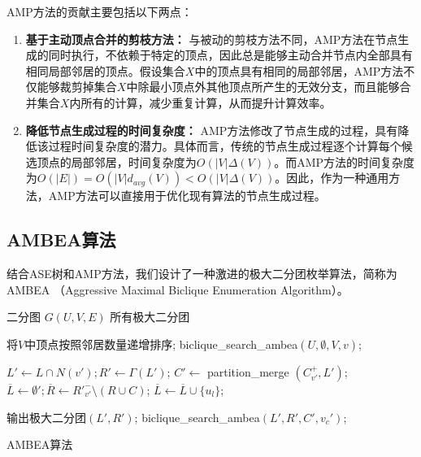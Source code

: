 AMP方法的贡献主要包括以下两点：

\begin{enumerate}
  \item \textbf{基于主动顶点合并的剪枝方法：} 与被动的剪枝方法不同，AMP方法在节点生成的同时执行，不依赖于特定的顶点，因此总是能够主动合并节点内全部具有相同局部邻居的顶点。假设集合$X$中的顶点具有相同的局部邻居，AMP方法不仅能够裁剪掉集合$X$中除最小顶点外其他顶点所产生的无效分支，而且能够合并集合$X$内所有的计算，减少重复计算，从而提升计算效率。
  
  \item \textbf{降低节点生成过程的时间复杂度：} AMP方法修改了节点生成的过程，具有降低该过程时间复杂度的潜力。具体而言，传统的节点生成过程逐个计算每个候选顶点的局部邻居，时间复杂度为$O(|V|\Delta(V))$。而AMP方法的时间复杂度为$O(|E|) =O(|V|d_{avg}(V)) < O(|V|\Delta(V))$。因此，作为一种通用方法，AMP方法可以直接用于优化现有算法的节点生成过程。

\end{enumerate}

\subsection{AMBEA算法}
\label{subsec:ambea}
  结合ASE树和AMP方法，我们设计了一种激进的极大二分团枚举算法，简称为AMBEA （Aggressive Maximal Biclique Enumeration Algorithm）。

\begin{algorithm}[H]
  \begin{algorithmic}[1]
    \normalsize
    \REQUIRE 二分图 $G(U,V,E)$
    \ENSURE 所有极大二分团
    
    \renewcommand{\algorithmicwhile}{\textbf{procedure}}
    \renewcommand{\algorithmicdo}{\textbf{:}}

    \STATE 将$V$中顶点按照邻居数量递增排序;
      \STATE \textsf{biclique\_search\_ambea}$(U,\emptyset,V,v)$;
    \ENDFOR

    \renewcommand{\algorithmicdo}{\textbf{do}}
      \STATE $L' \leftarrow L \cap N(v'); R' \leftarrow \Gamma(L')$;
      \STATE $C' \leftarrow$ \textsf{partition\_merge}    $(C_{v'}^+, L')$;
      \STATE $\overline{L} \leftarrow \emptyset'; \overline{R}\leftarrow {R'}_{v'}^- \setminus (R \cup C)$;
          \STATE $\overline{L} \leftarrow \overline{L} \cup \{u_l\}$;
        \ENDIF
      \ENDFOR

        \STATE 输出极大二分团$(L', R')$;
            \STATE \textsf{biclique\_search\_ambea}$(L', R', C', v_c')$;
          \ENDIF
        \ENDFOR
      \ENDIF
    \ENDWHILE

  \end{algorithmic}
  \caption{AMBEA算法}
  \label{alg:ambea}
\end{algorithm}


